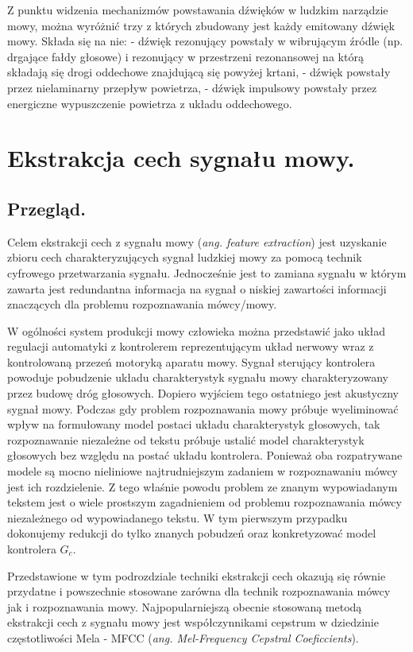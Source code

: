 Z punktu widzenia mechanizmów powstawania dźwięków w ludzkim narządzie mowy, można wyróżnić trzy z których zbudowany jest każdy emitowany dźwięk mowy. Składa się na nie:
- dźwięk rezonujący powstały w wibrującym źródle (np. drgające fałdy głosowe) i rezonujący w przestrzeni rezonansowej na którą składają się drogi oddechowe znajdującą się powyżej krtani,
- dźwięk powstały przez nielaminarny przepływ powietrza,
- dźwięk impulsowy powstały przez energiczne wypuszczenie powietrza z układu oddechowego.

\section{Ekstrakcja cech sygnału mowy.}

\label{featureextraction}
\subsection{Przegląd.}
Celem ekstrakcji cech z sygnału mowy (\textit{ang. feature extraction}) jest uzyskanie zbioru cech charakteryzujących sygnał ludzkiej mowy za pomocą technik cyfrowego przetwarzania sygnału. Jednocześnie jest to zamiana sygnału w którym zawarta jest redundantna informacja na sygnał o niskiej zawartości informacji znaczących dla problemu rozpoznawania mówcy/mowy. 

W ogólności system produkcji mowy człowieka można przedstawić jako układ regulacji automatyki z kontrolerem reprezentującym układ nerwowy wraz z kontrolowaną przezeń motoryką aparatu mowy. Sygnał sterujący kontrolera powoduje pobudzenie układu charakterystyk sygnału mowy charakteryzowany przez budowę dróg głosowych. Dopiero wyjściem tego ostatniego jest akustyczny sygnał mowy. Podczas gdy problem rozpoznawania mowy próbuje wyeliminować wpływ na formułowany model postaci układu charakterystyk głosowych, tak rozpoznawanie niezależne od tekstu próbuje ustalić model charakterystyk głosowych bez względu na postać układu kontrolera. Ponieważ oba rozpatrywane modele są mocno nieliniowe najtrudniejszym zadaniem w rozpoznawaniu mówcy jest ich rozdzielenie. Z tego właśnie powodu problem ze znanym wypowiadanym tekstem jest o wiele prostszym zagadnieniem od problemu rozpoznawania mówcy niezależnego od wypowiadanego tekstu. W tym pierwszym przypadku dokonujemy redukcji do tylko znanych pobudzeń oraz konkretyzować model kontrolera $G_c$. %

Przedstawione w tym podrozdziale techniki ekstrakcji cech okazują się równie przydatne i powszechnie stosowane zarówna dla technik rozpoznawania mówcy jak i rozpoznawania mowy. Najpopularniejszą obecnie stosowaną metodą ekstrakcji cech z sygnału mowy jest współczynnikami cepstrum w dziedzinie częstotliwości Mela -  MFCC (\textit{ang. Mel-Frequency Cepstral Coeficcients}). 

